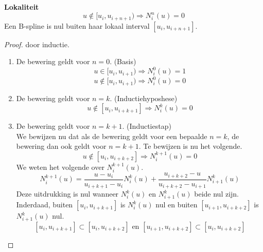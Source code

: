 \documentclass[computergesteund_ontwerp_van_curven_en_oppervlakken.tex]{subfiles}
\begin{document}
\begin{ei}\textbf{Lokaliteit}
\label{bspline_lokaliteit}
\[
u \not\in [u_i,u_{i+n+1}) \Rightarrow N_{i}^{n}(u) = 0
\]
Een B-spline is nul buiten haar lokaal interval $[u_i,u_{i+n+1}]$.

\begin{proof} door inductie.\\
\begin{enumerate}
\item De bewering geldt voor $n=0$. (Basis)
\[
u \in [u_i,u_{i+1}) \Rightarrow N_{i}^{0}(u) = 1
\]
\[
u \not\in [u_i,u_{i+1}) \Rightarrow N_{i}^{0}(u) = 0
\]
\item De bewering geldt voor $n=k$. (Inductiehyposhese)
\[
u \not\in [u_i,u_{i+k+1}] \Rightarrow N_{i}^{k}(u) = 0
\]
\item De bewering geldt voor $n=k+1$. (Inductiestap)\\
We bewijzen nu dat als de bewering geldt voor een bepaalde $n=k$, de bewering dan ook geldt voor $n=k+1$.
Te bewijzen is nu het volgende.
\[
u \not\in [u_i,u_{i+k+2}] \Rightarrow N_{i}^{k+1}(u) = 0
\]
We weten het volgende over $N_{i}^{k+1}(u)$.
\[
N_{i}^{k+1}(u)
= \frac{u-u_i}{u_{i+k+1}-u_i}					N_{i}^{k}(u)
+ \frac{u_{i+k+2}-u}{u_{i+k+2}-u_{i+1}}			N_{i+1}^{k}(u)
\]
Deze uitdrukking is nul wanneer $N_{i}^{k}(u)$ en $N_{i+1}^{k}(u)$ beide nul zijn. Inderdaad, buiten $[u_i,u_{i+k+1}]$ is $N_{i}^{k}(u)$ nul en buiten $[u_{i+1},u_{i+k+2}]$ is $N_{i+1}^{k}(u)$ nul.
\[
[u_i,u_{i+k+1}] \subset [u_i,u_{i+k+2}]
\text{ en }
[u_{i+1},u_{i+k+2}] \subset [u_i,u_{i+k+2}]
\]
\end{enumerate}
\end{proof}
\end{ei}
\end{document}
